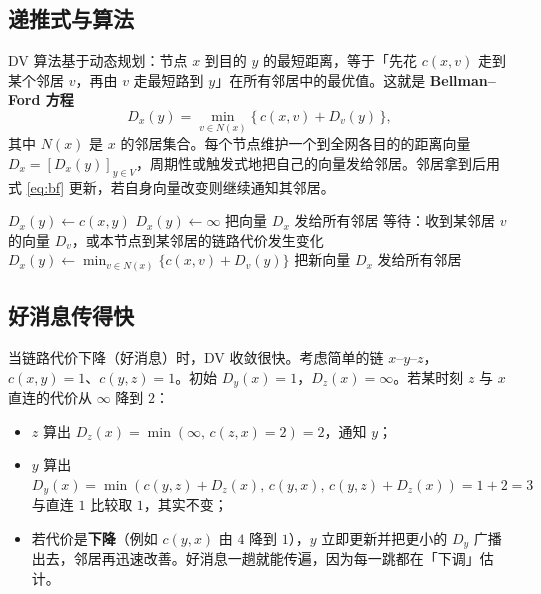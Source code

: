 \subsection{递推式与算法}

DV 算法基于动态规划：节点 $x$ 到目的 $y$ 的最短距离，等于「先花 $c(x,v)$ 走到某个邻居 $v$，再由 $v$ 走最短路到 $y$」在所有邻居中的最优值。这就是 \textbf{Bellman--Ford 方程}
\begin{equation}
    D_x(y) = \min_{v \in N(x)} \bigl\{\, c(x,v) + D_v(y) \,\bigr\},
    \label{eq:bf}
\end{equation}
其中 $N(x)$ 是 $x$ 的邻居集合。每个节点维护一个到全网各目的的距离向量 $D_x=[D_x(y)]_{y\in V}$，周期性或触发式地把自己的向量发给邻居。邻居拿到后用式 \eqref{eq:bf} 更新，若自身向量改变则继续通知其邻居。

\begin{algorithm}[H]
\caption{距离向量算法（在节点 $x$ 上运行）}
\begin{algorithmic}[1]
         $D_x(y)\gets c(x,y)$ \Else $D_x(y)\gets\infty$ \EndIf
    \EndFor
    \State 把向量 $D_x$ 发给所有邻居
    \Loop
        \State 等待：收到某邻居 $v$ 的向量 $D_v$，或本节点到某邻居的链路代价发生变化
            \State $D_x(y) \gets \min_{v\in N(x)} \bigl\{ c(x,v) + D_v(y) \bigr\}$ 
        \EndFor
         把新向量 $D_x$ 发给所有邻居 \EndIf
    \EndLoop
\EndProcedure
\end{algorithmic}
\end{algorithm}

\subsection{好消息传得快}

当链路代价下降（好消息）时，DV 收敛很快。考虑简单的链 $x$--$y$--$z$，$c(x,y)=1$、$c(y,z)=1$。初始 $D_y(x)=1$，$D_z(x)=\infty$。若某时刻 $z$ 与 $x$ 直连的代价从 $\infty$ 降到 $2$：
\begin{itemize}
    \item $z$ 算出 $D_z(x)=\min(\infty,\,c(z,x)=2)=2$，通知 $y$；
    \item $y$ 算出 $D_y(x)=\min(c(y,z)+D_z(x),\,c(y,x),\,c(y,z)+D_z(x))=1+2=3$ 与直连 $1$ 比较取 $1$，其实不变；
    \item 若代价是\textbf{下降}（例如 $c(y,x)$ 由 $4$ 降到 $1$），$y$ 立即更新并把更小的 $D_y$ 广播出去，邻居再迅速改善。好消息一趟就能传遍，因为每一跳都在「下调」估计。
\end{itemize}

